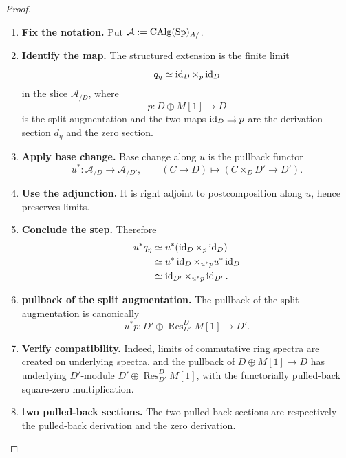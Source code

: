\begin{proof}
\leavevmode
\begin{enumerate}[label=\textup{(\arabic*)}]
    \item \textbf{Fix the notation.}
    Put \(\mathcal A:=\operatorname{CAlg}(\operatorname{Sp})_{A/}\).

    \item \textbf{Identify the map.}
    The structured extension is the finite limit
    \[
        q_\eta
        \simeq
        \operatorname{id}_D\times_p\operatorname{id}_D
    \]
    in the slice \(\mathcal A_{/D}\), where
    \[
        p:D\oplus M[1]\longrightarrow D
    \]
    is the split augmentation and the two maps \(\operatorname{id}_D\rightrightarrows p\) are the derivation section
    \(d_\eta\) and the zero section.

    \item \textbf{Apply base change.}
    Base change along \(u\) is the pullback functor
    \[
        u^*:\mathcal A_{/D}\longrightarrow\mathcal A_{/D'},
        \qquad
        (C\to D)\longmapsto(C\times_DD'\to D').
    \]

    \item \textbf{Use the adjunction.}
    It is right adjoint to postcomposition along \(u\), hence preserves limits.

    \item \textbf{Conclude the step.}
    Therefore
    \[
    \begin{aligned}
        u^*q_\eta
        &\simeq
        u^*(\operatorname{id}_D\times_p\operatorname{id}_D)
        \\
        &\simeq
        u^*\operatorname{id}_D\times_{u^*p}u^*\operatorname{id}_D
        \\
        &\simeq
        \operatorname{id}_{D'}\times_{u^*p}\operatorname{id}_{D'}.
    \end{aligned}
    \]

    \item \textbf{pullback of the split augmentation.}
    The pullback of the split augmentation is canonically
    \[
        u^*p:
        D'\oplus\operatorname{Res}^{D}_{D'}M[1]
        \longrightarrow D'.
    \]

    \item \textbf{Verify compatibility.}
    Indeed, limits of commutative ring spectra are created on underlying spectra, and the
    pullback of \(D\oplus M[1]\to D\) has underlying \(D'\)-module \(D'\oplus\operatorname{Res}^{D}_{D'}M[1]\), with the functorially
    pulled-back square-zero multiplication.

    \item \textbf{two pulled-back sections.}
    The two pulled-back sections are respectively the pulled-back derivation and the zero
    derivation.


\end{enumerate}
\end{proof}
